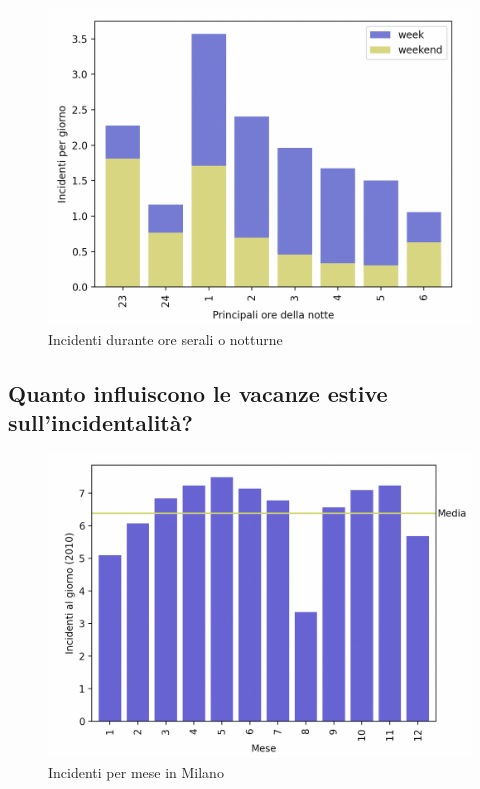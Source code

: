 \documentclass[a4paper]{report}
\begin{document}
\begin{figure}
    \includegraphics[width=\linewidth]{../src/incidenti/incidenti_senza_coords/ore_punta/ore_notte.png}
    \caption{Incidenti durante ore serali o notturne}
    \label{fig:ore_notte}
\end{figure}


\subsection{Quanto influiscono le vacanze estive sull'incidentalità?}

\begin{figure}
    \includegraphics[width=\linewidth]{../src/incidenti/incidenti_senza_coords/mese_incidenti/milano_mese.png}
    \caption{Incidenti per mese in Milano}
    \label{fig:milano_mese}
\end{figure}
\end{document}
